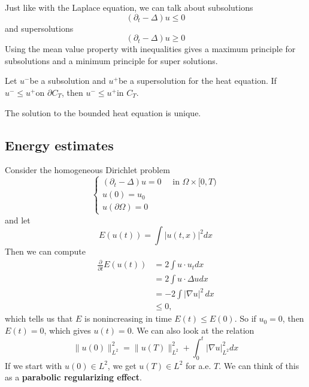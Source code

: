 \begin{remark}
    Just like with the Laplace equation, we can talk about subsolutions
    $$
    \left(\partial_{t}-\Delta\right) u \leq 0
    $$
    and supersolutions
    $$
    \left(\partial_{t}-\Delta\right) u \geq 0
    $$
    Using the mean value property with inequalities gives a maximum principle for subsolutions and a minimum principle for super solutions.
\end{remark}

\begin{theorem}
     Let $u^{-}$be a subsolution and $u^{+}$be a supersolution for the heat equation. If $u^{-} \leq u^{+}$on $\partial C_{T}$, then $u^{-} \leq u^{+}$in $C_{T}$.
\end{theorem}

\begin{corollary}
    The solution to the bounded heat equation is unique.
\end{corollary}

\subsection{Energy estimates}
Consider the homogeneous Dirichlet problem
$$
\left\{\begin{array}{l}
\left(\partial_{t}-\Delta\right) u=0 \quad \text { in } \Omega \times[0, T) \\
u(0)=u_{0} \\
u(\partial \Omega)=0
\end{array}\right.
$$
and let
$$
E(u(t))=\int|u(t, x)|^{2} d x
$$
Then we can compute
$$
\begin{aligned}
\frac{\partial}{\partial t} E(u(t)) &=2 \int u \cdot u_{t} d x \\
&=2 \int u \cdot \Delta u d x\\
&= -2\int |\nabla u|^2 \,dx\\
&\le 0,
\end{aligned}
$$
which tells us that $E$ is nonincreasing in time $E(t) \leq E(0) .$ So if $u_{0}=0$, then $E(t)=0$, which gives $u(t)=0$.
We can also look at the relation
$$
\|u(0)\|_{L^{2}}^{2}=\|u(T)\|_{L^{2}}^{2}+\int_{0}^{t}|\nabla u|_{L^{2}}^{2} d x
$$
If we start with $u(0) \in L^{2}$, we get $ u(T) \in L^{2}$ for a.e. $T$. We can think of this as a \textbf{parabolic regularizing effect}.